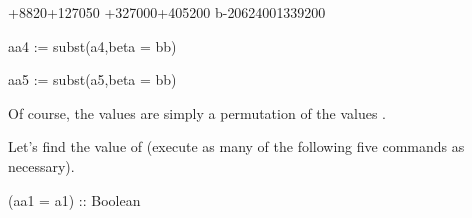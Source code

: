 {{{{{{{{{{{{{{{{{{\begin{xtc}
\begin{TeXOutput}
\begin{fricasmath}{21}
{{\TIMES {}}+8820\TIMES {}+127050\TIMES %
+327000\TIMES {}+405200\TIMES \SYMBOL%
{b}-{2062400}}{1339200}%
\end{fricasmath}
\end{TeXOutput}
\end{xtc}
\begin{xtc}
\begin{xtccomment}
\end{xtccomment}
\begin{spadsrc}
aa4 := subst(a4,beta = bb) 
\end{spadsrc}
\begin{TeXOutput}
\begin{fricasmath}{22}
%
\end{fricasmath}
\end{TeXOutput}
\end{xtc}
\begin{xtc}
\begin{xtccomment}
\end{xtccomment}
\begin{spadsrc}
aa5 := subst(a5,beta = bb) 
\end{spadsrc}
\begin{TeXOutput}
\begin{fricasmath}{23}
%
\end{fricasmath}
\end{TeXOutput}
\end{xtc}
%
Of course, the values  are simply a permutation of the values
.
%
\begin{xtc}
\begin{xtccomment}
Let's find the value of  (execute as many of the following five commands
as necessary).
\end{xtccomment}
\begin{spadsrc}
(aa1 = a1) :: Boolean 
\end{spadsrc}
\begin{TeXOutput}
\begin{fricasmath}{24}

\end{fricasmath}
\end{TeXOutput}
\end{xtc}}}}}}}}}}}}}}}}}}}
